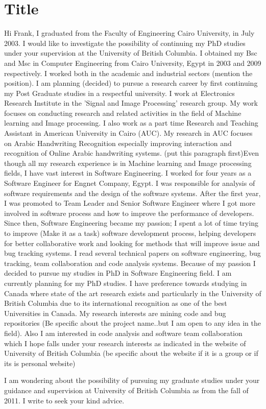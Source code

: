 \documentclass{article}
\begin{document}
\section{Title}

Hi Frank,
I graduated from the Faculty of Engineering Cairo University, in July 2003. I would like to  investigate the possibility of continuing my PhD studies under your supervision at the University of British Columbia. I obtained my Bsc and Msc in Computer Engineering from  Cairo University, Egypt in  2003 and 2009 respectively.  I worked both in the academic and industrial sectors (mention the position).  I am planning (decided) to pursue a research career by first continuing my Post Graduate studies in a respectful university.
I work at Electronics Research Institute in the 'Signal and Image Processing' research group. My work focuses on conducting research and related activities in the field of Machine learning and Image processing. I also work as a part time Research and Teaching Assistant in American University in Cairo (AUC).  My research in AUC focuses on Arabic Handwriting Recognition especially improving interaction and recognition of Online Arabic handwriting systems.
(put this paragraph first)Even though all my research experience is in Machine learning and Image processing fields, I have vast interest in Software Engineering.   I worked for four years as a Software Engineer for Engnet Company, Egypt. I was responsible for analysis of software requirements and the design of the software systems. After the first year, I was promoted to Team Leader and Senior Software Engineer where I got more involved in software process and how to improve the performance of developers. Since then, Software Engineering became my passion; I spent a lot of time trying to improve (Make it as a task) software development process, helping developers for better collaborative work and looking for methods that will improve issue and bug tracking systems.  I read  several  technical papers on software engineering, bug tracking, team collaboration and code analysis systems.  Because of my passion I decided to pursue my studies in PhD in Software Engineering field.
I am currently planning for my PhD studies. I have preference towards studying in Canada where state of the art research exists and particularly in the University of British Columbia due to its international recognition as one of the best Universities in Canada. My research interests are mining code and bug repositories (Be specific about the project name..but I am open to any idea in the field). Also I am interested in code analysis and software team collaboration which I hope falls under your research interests as indicated in the website of University of British Columbia (be specific about the website if it is a group or if its is personal website)

I am wondering about the possibility of pursuing my graduate studies under your  guidance and supervision at University of British Columbia as from the fall of 2011. I write to seek your kind advice.
\end{document}
